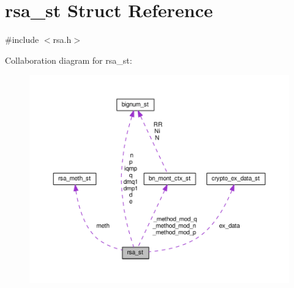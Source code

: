 \hypertarget{structrsa__st}{}\section{rsa\+\_\+st Struct Reference}
\label{structrsa__st}


{\ttfamily \#include $<$rsa.\+h$>$}



Collaboration diagram for rsa\+\_\+st\+:
\nopagebreak
\begin{figure}[H]
\begin{center}
\leavevmode
\includegraphics[width=350pt]{structrsa__st__coll__graph}
\end{center}
\end{figure}
